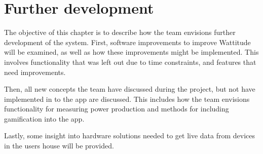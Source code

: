 \chapter{Further development}
\label{sec:further}
The objective of this chapter is to describe how the team envisions further development of the system. First, software improvements to improve Wattitude will be examined, as well as how these improvements might be implemented. This involves functionality that was left out due to time constraints, and features that need improvements. 

Then, all new concepts the team have discussed during the project, but not have implemented in to the app are discussed. This includes how the team envisions functionality for measuring power production and methods for including gamification into the app. 

Lastly, some insight into hardware solutions needed to get live data from devices in the users house will be provided. 





